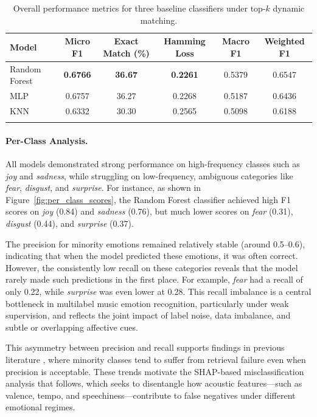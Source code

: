 \documentclass{article}
\begin{document}
\begin{table}[H]
\centering
\label{tab:model_comparison}
\begin{tabular}{lccccc}
\toprule
\textbf{Model} & \textbf{Micro F1} & \textbf{Exact Match (\%)} & \textbf{Hamming Loss} & \textbf{Macro F1} & \textbf{Weighted F1} \\
\midrule
Random Forest     & \textbf{0.6766} & \textbf{36.67} & \textbf{0.2261} & 0.5379 & 0.6547 \\
MLP               & 0.6757          & 36.27          & 0.2268          & 0.5187 & 0.6436 \\
KNN               & 0.6332          & 30.30          & 0.2565          & 0.5098 & 0.6188 \\
\bottomrule
\caption{Overall performance metrics for three baseline classifiers under top-$k$ dynamic matching.}
\end{tabular}
\end{table}


\paragraph{Per-Class Analysis.}
All models demonstrated strong performance on high-frequency classes such as \textit{joy} and \textit{sadness}, while struggling on low-frequency, ambiguous categories like \textit{fear}, \textit{disgust}, and \textit{surprise}. For instance, as shown in Figure~\ref{fig:per_class_scores}, the Random Forest classifier achieved high F1 scores on \textit{joy} (0.84) and \textit{sadness} (0.76), but much lower scores on \textit{fear} (0.31), \textit{disgust} (0.44), and \textit{surprise} (0.37).

The precision for minority emotions remained relatively stable (around 0.5--0.6), indicating that when the model predicted these emotions, it was often correct. However, the consistently low recall on these categories reveals that the model rarely made such predictions in the first place. For example, \textit{fear} had a recall of only 0.22, while \textit{surprise} was even lower at 0.28. This recall imbalance is a central bottleneck in multilabel music emotion recognition, particularly under weak supervision, and reflects the joint impact of label noise, data imbalance, and subtle or overlapping affective cues.

This asymmetry between precision and recall supports findings in previous literature \parencite{Ahsan2015, Tuba2025}, where minority classes tend to suffer from retrieval failure even when precision is acceptable. These trends motivate the SHAP-based misclassification analysis that follows, which seeks to disentangle how acoustic features—such as valence, tempo, and speechiness—contribute to false negatives under different emotional regimes.
\end{document}
